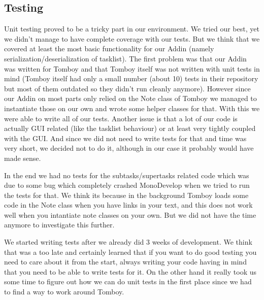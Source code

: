 \subsection{Testing}
\label{testing}
Unit testing proved to be a tricky part in our environment. We tried our best, yet we didn't manage to have complete coverage with our tests. But we think that we covered at least the most basic functionality for our Addin (namely serialization/deserialization of tasklist).
The first problem was that our Addin was written for Tomboy and that Tomboy itself was not written with unit tests in mind (Tomboy itself had only a small number (about 10) tests in their repository but most of them outdated so they didn't run cleanly anymore). However since our Addin on most parts only relied on the Note class of Tomboy we managed to instantiate those on our own and wrote some helper classes for that. With this we were able to write all of our tests.
Another issue is that a lot of our code is actually GUI related (like the tasklist behaviour) or at least very tightly coupled with the GUI. And since we did not need to write tests for that and time was very short, we decided not to do it, although in our case it probably would have made sense.

In the end we had no tests for the subtasks/supertasks related code which was due to some bug which completely crashed MonoDevelop when we tried to run the tests for that. We think its because in the background Tomboy loads some code in the Note class when you have links in your text, and this does not work well when you intantiate note classes on your own. But we did not have the time anymore to investigate this further.

We started writing tests after we already did 3 weeks of development. We think that was a too late and certainly learned that if you want to do good testing you need to care about it from the start, always writing your code having in mind that you need to be able to write tests for it. On the other hand it really took us some time to figure out how we can do unit tests in the first place since we had to find a way to work around Tomboy.